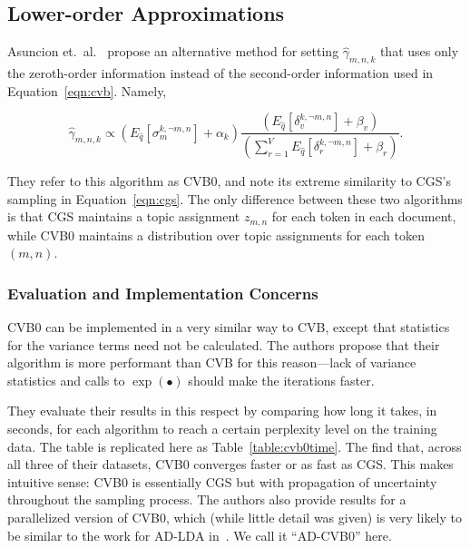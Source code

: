 \documentclass[11pt]{article}
\begin{document}
\subsection{Lower-order Approximations}
Asuncion et.\ al.~\cite{Asuncion:2009:onsmoothing} propose an alternative
method for setting $\hat{\gamma}_{m,n,k}$ that uses only the zeroth-order
information instead of the second-order information used in
Equation~\ref{eqn:cvb}. Namely,

\begin{equation}
  \hat{\gamma}_{m,n,k} \propto
  \left(E_{\hat{q}}[\sigma_m^{k,\neg m,n}] + \alpha_k\right)
  \frac{\left(E_{\hat{q}}[\delta_v^{k,\neg m,n}] + \beta_v\right)}
  {\left(\sum_{r=1}^V E_{\hat{q}}[\delta_r^{k, \neg m,n}] +
  \beta_r\right)}.
  \label{eqn:cvb0}
\end{equation}

They refer to this algorithm as CVB0, and note its extreme similarity to
CGS's sampling in Equation~\ref{eqn:cgs}. The only difference between these
two algorithms is that CGS maintains a topic assignment $z_{m,n}$ for each
token in each document, while CVB0 maintains a distribution over topic
assignments for each token $(m,n)$.

\subsubsection{Evaluation and Implementation Concerns}
CVB0 can be implemented in a very similar way to CVB, except that
statistics for the variance terms need not be calculated. The authors
propose that their algorithm is more performant than CVB for this
reason---lack of variance statistics and calls to $\exp(\bullet)$ should
make the iterations faster.

They evaluate their results in this respect by comparing how long it takes,
in seconds, for each algorithm to reach a certain perplexity level on the
training data. The table is replicated here as Table~\ref{table:cvb0time}.
The find that, across all three of their datasets, CVB0 converges faster or
as fast as CGS. This makes intuitive sense: CVB0 is essentially CGS but
with propagation of uncertainty throughout the sampling process. The
authors also provide results for a parallelized version of CVB0, which
(while little detail was given) is very likely to be similar to the work
for AD-LDA in~\cite{Newman:2009:ADLDA}. We call it ``AD-CVB0'' here.
\end{document}
